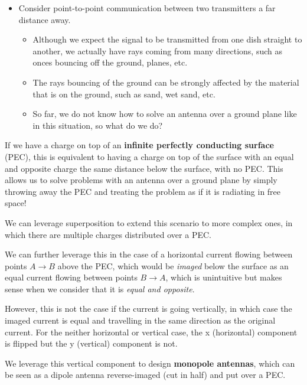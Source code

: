 \documentclass{article}
\begin{document}
\begin{itemize}
    \item Consider point-to-point communication between two transmitters a far distance away.
    \begin{itemize}
        \item Although we expect the signal to be transmitted from one dish straight to another, we actually have rays coming from many directions, such as onces bouncing off the ground, planes, etc.
        \item The rays bouncing of the ground can be strongly affected by the material that is on the ground, such as sand, wet sand, etc.
        \item So far, we do not know how to solve an antenna over a ground plane like in this situation, so what do we do?
    \end{itemize}
\end{itemize}

If we have a charge on top of an \textbf{infinite perfectly conducting surface} (PEC), this is equivalent to having a charge on top of the surface with an equal and opposite charge the same distance below the surface, with no PEC. This allows us to solve problems with an antenna over a ground plane by simply throwing away the PEC and treating the problem as if it is radiating in free space!

We can leverage superposition to extend this scenario to more complex ones, in which there are multiple charges distributed over a PEC. 

We can further leverage this in the case of a horizontal current flowing between points $A \to B$ above the PEC, which would be \textit{imaged} below the surface as an equal current flowing between points $B \to A$, which is unintuitive but makes sense when we consider that it is \textit{equal and opposite}.

However, this is not the case if the current is going vertically, in which case the imaged current is equal and travelling in the same direction as the original current. For the neither horizontal or vertical case, the x (horizontal) component is flipped but the y (vertical) component is not.

We leverage this vertical component to design \textbf{monopole antennas}, which can be seen as a dipole antenna reverse-imaged (cut in half) and put over a PEC.
\end{document}
